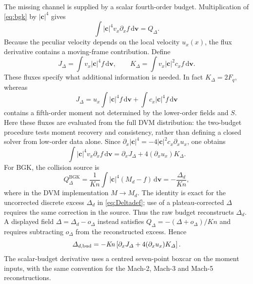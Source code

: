 \documentclass[lineno,paper]{JFM-FLM_Au}
\newenvironment{revision}{\nolinenumbers\begin{tcolorbox}[breakable,colback=revisionyellow,colframe=revisionyellow,boxrule=0pt,arc=0pt,left=5pt,right=5pt,top=5pt,bottom=5pt,before skip=6pt,after skip=6pt]\captionsetup{width=\linewidth}}{\end{tcolorbox}\linenumbers}
\newenvironment{revision}{}{}
\newcommand{\Kn}{\mathit{Kn}}
\newcommand{\dd}{\mathrm{d}}
\begin{document}
\begin{revision}
The missing channel is supplied by a scalar fourth-order budget.  Multiplication of \eqref{eq:bgk} by $|\boldsymbol c|^4$ gives
\begin{equation}
  \int |\boldsymbol c|^4 v_x\partial_x f\,\dd\boldsymbol v = Q_\Delta .
  \label{eq:delta_raw}
\end{equation}
Because the peculiar velocity depends on the local velocity $u_x(x)$, the flux derivative contains a moving-frame contribution.  Define
\begin{equation}
  J_\Delta=\int v_x|\boldsymbol c|^4 f\,\dd\boldsymbol v,
  \qquad
  K_\Delta=\int v_x|\boldsymbol c|^2 c_x f\,\dd\boldsymbol v .
  \label{eq:J_K_delta}
\end{equation}
These fluxes specify what additional information is needed. In fact $K_\Delta=2F_q$, whereas
\[
 J_\Delta=u_x\int |\boldsymbol c|^4f\,\dd\boldsymbol v
             +\int c_x|\boldsymbol c|^4f\,\dd\boldsymbol v
\]
contains a fifth-order moment not determined by the lower-order fields and $S$. Here these fluxes are evaluated from the full DVM distribution: the two-budget procedure tests moment recovery and consistency, rather than defining a closed solver from low-order data alone. Since $\partial_x|\boldsymbol c|^4=-4|\boldsymbol c|^2c_x\partial_xu_x$, one obtains
\begin{equation}
  \int |\boldsymbol c|^4 v_x\partial_x f\,\dd\boldsymbol v
  =\partial_x J_\Delta+4(\partial_xu_x)K_\Delta .
  \label{eq:delta_flux_identity}
\end{equation}
For BGK, the collision source is
\begin{equation}
  Q_\Delta^{\mathrm{BGK}}=\frac{1}{\Kn}\int |\boldsymbol c|^4(M_d-f)\,\dd\boldsymbol v=-\frac{\Delta_d}{\Kn} ,
  \label{eq:delta_bgk_source}
\end{equation}
where in the DVM implementation $M\to M_d$. The identity is exact for the uncorrected discrete excess $\Delta_d$ in \eqref{eq:Deltadef}; use of a plateau-corrected $\Delta$ requires the same correction in the source. Thus the raw budget reconstructs $\Delta_d$. A displayed field $\Delta=\Delta_d-o_\Delta$ instead satisfies $Q_\Delta=-(\Delta+o_\Delta)/\Kn$ and requires subtracting $o_\Delta$ from the reconstructed excess. Hence
\begin{equation}
  \Delta_{d,\rm bud}=-\Kn\left[\partial_xJ_\Delta+4(\partial_xu_x)K_\Delta\right].
  \label{eq:delta_rec}
\end{equation}
The scalar-budget derivative uses a centred seven-point boxcar on the moment inputs, with the same convention for the Mach-2, Mach-3 and Mach-5 reconstructions. 
\end{revision}
\end{document}
